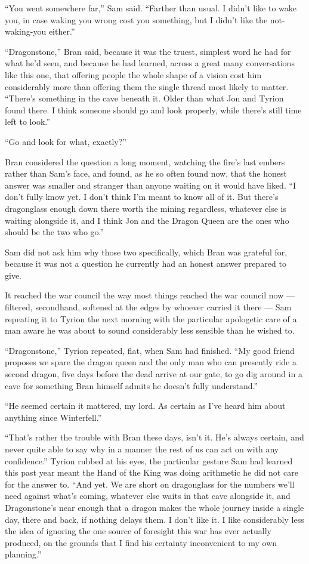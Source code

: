 “You went somewhere far,” Sam said. “Farther than usual. I didn’t like to wake you, in case waking you wrong cost you something, but I didn’t like the not-waking-you either.”

“Dragonstone,” Bran said, because it was the truest, simplest word he had for what he’d seen, and because he had learned, across a great many conversations like this one, that offering people the whole shape of a vision cost him considerably more than offering them the single thread most likely to matter. “There’s something in the cave beneath it. Older than what Jon and Tyrion found there. I think someone should go and look properly, while there’s still time left to look.”

“Go and look for what, exactly?”

Bran considered the question a long moment, watching the fire’s last embers rather than Sam’s face, and found, as he so often found now, that the honest answer was smaller and stranger than anyone waiting on it would have liked. “I don’t fully know yet. I don’t think I’m meant to know all of it. But there’s dragonglass enough down there worth the mining regardless, whatever else is waiting alongside it, and I think Jon and the Dragon Queen are the ones who should be the two who go.”

Sam did not ask him why those two specifically, which Bran was grateful for, because it was not a question he currently had an honest answer prepared to give.

\sceneBreak

It reached the war council the way most things reached the war council now — filtered, secondhand, softened at the edges by whoever carried it there — Sam repeating it to Tyrion the next morning with the particular apologetic care of a man aware he was about to sound considerably less sensible than he wished to.

“Dragonstone,” Tyrion repeated, flat, when Sam had finished. “My good friend proposes we spare the dragon queen and the only man who can presently ride a second dragon, five days before the dead arrive at our gate, to go dig around in a cave for something Bran himself admits he doesn’t fully understand.”

“He seemed certain it mattered, my lord. As certain as I’ve heard him about anything since Winterfell.”

“That’s rather the trouble with Bran these days, isn’t it. He’s always certain, and never quite able to say why in a manner the rest of us can act on with any confidence.” Tyrion rubbed at his eyes, the particular gesture Sam had learned this past year meant the Hand of the King was doing arithmetic he did not care for the answer to. “And yet. We are short on dragonglass for the numbers we’ll need against what’s coming, whatever else waits in that cave alongside it, and Dragonstone’s near enough that a dragon makes the whole journey inside a single day, there and back, if nothing delays them. I don’t like it. I like considerably less the idea of ignoring the one source of foresight this war has ever actually produced, on the grounds that I find his certainty inconvenient to my own planning.”

